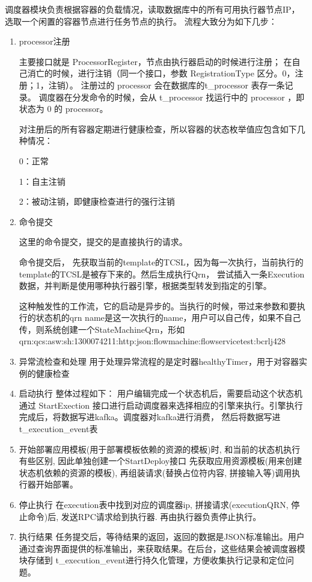 调度器模块负责根据容器的负载情况，读取数据库中的所有可用执行器节点IP，选取一个闲置的容器节点进行任务节点的执行。
流程大致分为如下几步：
\begin{enumerate}
    \item processor注册

    主要接口就是 ProcessorRegister，节点由执行器启动的时候进行注册；
    在自己消亡的时候，进行注销（同一个接口，参数 RegistrationType 区分。0，注册；1，注销）。
    注册过的 processor 会在数据库的t\_processor 表存一条记录。
    调度器在分发命令的时候，会从 t\_processor 找运行中的 processor ，即状态为 0 的 processor。

    对注册后的所有容器定期进行健康检查，所以容器的状态枚举值应包含如下几种情况：

    0：正常

    1：自主注销

    2：被动注销，即健康检查进行的强行注销

    \item 命令提交

    这里的命令提交，提交的是直接执行的请求。

    命令提交后， 先获取当前的template的TCSL，因为每一次执行，当前执行的template的TCSL是被存下来的。然后生成执行Qrn，
    尝试插入一条Execution数据，并判断是使用哪种执行器引擎，根据类型转发到指定的引擎。

    这种触发性的工作流，它的启动是异步的。当执行的时候，带过来参数和要执行的状态机的qrn
    name是这一次执行的name，用户可以自己传，如果不自己传，则系统创建一个StateMachineQrn，形如
    qrn:qcs:asw:sh:1300074211:http:json:flowmachine:flowservicetest:bcrlj428
    \item 异常流检查和处理
    用于处理异常流程的是定时器healthyTimer，用于对容器实例的健康检查
    \item 启动执行
    整体过程如下：
    用户编辑完成一个状态机后，需要启动这个状态机
    通过 StartExection 接口进行启动调度器来选择相应的引擎来执行。引擎执行完成后，将数据写进kafka。调度器对kafka进行消费，
    然后将数据写进 t\_execution\_event表
    \item 开始部署应用模板(用于部署模板依赖的资源的模板)时, 和当前的状态机执行有些区别, 因此单独创建一个StartDeploy接口
    先获取应用资源模板(用来创建状态机依赖的资源的模板), 再组装请求(替换占位符内容, 拼接输入等)调用执行器开始部署。
    \item 停止执行
    在execution表中找到对应的调度器ip, 拼接请求(executionQRN, 停止命令)后, 发送RPC请求给到执行器. 再由执行器负责停止执行。
    \item 执行结果
    任务提交后，等待结果的返回，返回的数据是JSON标准输出。用户通过查询界面提供的标准输出，来获取结果。在后台，这些结果会被调度器模块存储到
    t\_execution\_event进行持久化管理，方便收集执行记录和定位问题。
\end{enumerate}

